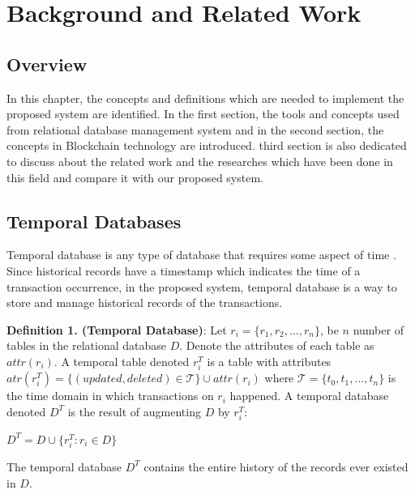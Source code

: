 \chapter{Background and Related Work}

\section{Overview}

In this chapter, the concepts and definitions which are needed to implement the proposed system are identified. In the first section, the tools and concepts used from relational database management system and in the second section, the concepts in Blockchain technology are introduced. third section is also dedicated to discuss about the related work and the researches which have been done in this field and compare it with our proposed system.

\section{Temporal Databases}
Temporal database is any type of database that requires some aspect of time \cite {elmasri2010fundamentalsofdatabase}. Since historical records have a timestamp which indicates the time of a transaction occurrence, in the proposed system, temporal database is a way to store and manage historical records of the transactions.


\textbf {Definition 1. (Temporal Database)}:
Let $ r_i = \{r_1, r_2, ... , r_n \}$, be $n$ number of tables in the relational database $D$. Denote the attributes of each table as $attr(r_i)$. A temporal table denoted $r_i^T$ is a table with attributes $atr(r_i^T) = \{ (updated, deleted) \in \mathcal{T} \}\cup attr(r_i)$ where $\mathcal{T} = \{t_0,t_1,...,t_n\}$ is the time domain in which transactions on $r_i$ happened. A temporal database denoted $D^T$ is the result of augmenting $D$ by $r_i^T$:

\begin{center}
	{$D^T = D \cup \{{r_i^T}: r_i \in D \}$}
\end{center}

The temporal database $D^T$ contains the entire history of the records ever existed in $D$.

